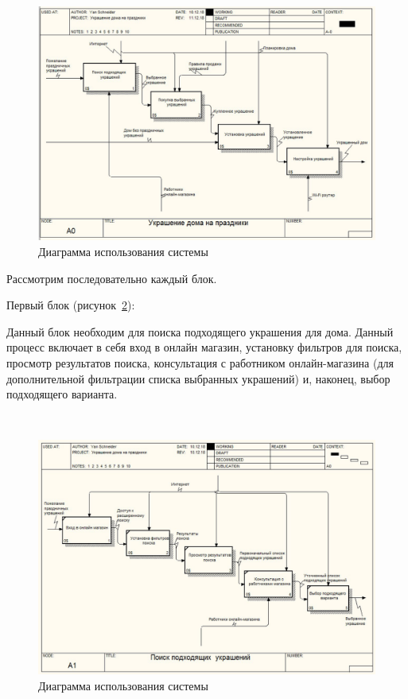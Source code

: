 ~
\begin{figure}[H]
\centering
	\includegraphics[scale=0.6]{figures/functionalModel/a0_decoration.jpg}
	\caption{Диаграмма использования системы}
	\label{fig:develop:functionalModel:a0_decoration}
\end{figure}

Рассмотрим последовательно каждый блок.

Первый блок (рисунок~\ref{fig:develop:functionalModel:a1_search}):

Данный блок необходим для поиска подходящего украшения для дома. Данный процесс включает в себя вход в онлайн магазин, установку фильтров для поиска, просмотр результатов поиска, консультация с работником онлайн-магазина (для дополнительной фильтрации списка выбранных украшений) и, наконец, выбор подходящего варианта.

 ~
\begin{figure}[H]
\centering
	\includegraphics[scale=0.6]{figures/functionalModel/a1_search.jpg}
	\caption{Диаграмма использования системы}
	\label{fig:develop:functionalModel:a1_search}
\end{figure}

